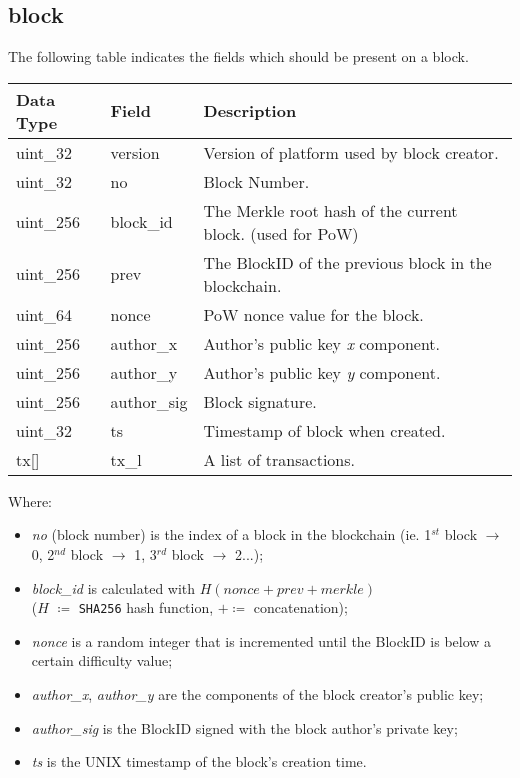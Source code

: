 \documentclass{article}
\begin{document}
\newpage

\subsection{block}
The following table indicates the fields which should be present on a block.
\begin{table}[H]
\centering
\begin{tabular}{|p{1.3cm}|p{2.5cm}|p{5.5cm}|}
\hline
\rowcolor{tblgrey} 
Data Type   & Field      & Description                            \\ \hline
uint\_32    & version     & Version of platform used by block creator.          \\ \hline
uint\_32    & no          & Block Number.                                       \\ \hline
uint\_256   & block\_id   & The Merkle root hash of the current block. (used for PoW)  \\ \hline
uint\_256   & prev        & The BlockID of the previous block in the blockchain.   \\ \hline
uint\_64    & nonce       & PoW nonce value for the block.                      \\ \hline
uint\_256   & author\_x   & Author's public key \textit{x} component.           \\ \hline
uint\_256   & author\_y   & Author's public key \textit{y} component.           \\ \hline
uint\_256   & author\_sig & Block signature.                                    \\ \hline
uint\_32    & ts          & Timestamp of block when created.                    \\ \hline
tx[\hspace{0.05cm}] & tx\_l       & A list of transactions.                            \\ \hline
\end{tabular}
\end{table}
Where:
\begin{itemize}
    \item \textit{no} (block number) is the index of a block in the blockchain (ie. 1$^{st}$ block $\rightarrow$ 0, 2$^{nd}$ block $\rightarrow$ 1, 3$^{rd}$ block $\rightarrow$ 2...);
    \item \textit{block\_id} is calculated with $H(\textit{nonce} + \textit{prev} + \textit{merkle})$ \\
    ($H$ $\coloneqq$ \texttt{SHA256} hash function, $+ \coloneqq$ concatenation); 
    \item \textit{nonce} is a random integer that is incremented until the BlockID is below a certain difficulty value;
    \item \textit{author\_x}, \textit{author\_y} are the components of the block creator's public key;
    \item \textit{author\_sig} is the BlockID signed with the block author's private key;
    \item \textit{ts} is the UNIX timestamp of the block's creation time.
\end{itemize}
\end{document}
